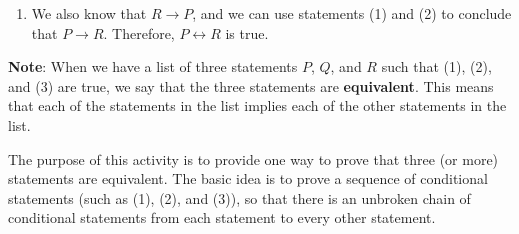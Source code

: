 \begin{enumerate}
\begin{enumerate}
\item We also know that  $R \to P$, and we can use statements (1) and (2) to conclude that  
$P \to R$.  Therefore,  $P \leftrightarrow R$  is true.
\end{enumerate}

\textbf{Note}:
When we have a list of three statements  $P$, $Q$,  and  $R$  such that  (1), (2), and (3) are true, we say that the three statements are \textbf{equivalent}.  This means that each of the statements in the list implies each of the other statements in the list.  

The purpose of this activity is to provide one way to prove that three (or more) statements are equivalent.  The basic idea is to prove a sequence of conditional statements (such as (1), (2), and (3)), so that there is an unbroken chain of conditional statements from each statement to every other statement.
\end{enumerate}
\hbreak

\newpage

\endinput
